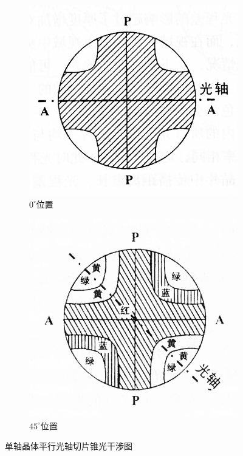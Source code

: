\documentclass[11pt,a4paper]{article}
\begin{document}
\begin{spacing}{1.3}
\begin{CJK*}{UTF8}{gbsn}
\begin{figure}
\begin{subfigure}[b]{0.45\textwidth}
\includegraphics[width=\linewidth]{fig4-1-10a}
\caption{$0^{\circ}$位置}
\label{fig:4-1-10a}
\end{subfigure}
\begin{subfigure}[b]{0.45\textwidth}
\includegraphics[width=\linewidth]{fig4-1-10b}
\caption{$45^{\circ}$位置}
\label{fig:4-1-10b}
\end{subfigure}
\caption{单轴晶体平行光轴切片锥光干涉图}\label{fig:my_label}
\end{figure} 


\end{CJK*}
\end{spacing}
\end{document}
